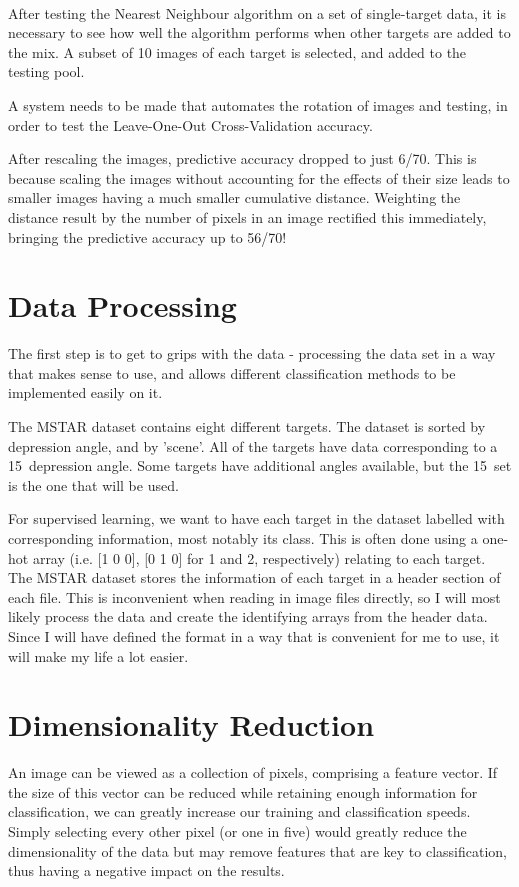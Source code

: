 \paragraph{}
After testing the Nearest Neighbour algorithm on a set of single-target data, it is necessary to see how well the algorithm performs when other targets are added to the mix. A subset of 10 images of each target is selected, and added to the testing pool.

A system needs to be made that automates the rotation of images and testing, in order to test the Leave-One-Out Cross-Validation accuracy.

After rescaling the images, predictive accuracy dropped to just 6/70. This is because scaling the images without accounting for the effects of their size leads to smaller images having a much smaller cumulative distance. Weighting the distance result by the number of pixels in an image rectified this immediately, bringing the predictive accuracy up to 56/70!



\section{Data Processing}
The first step is to get to grips with the data - processing the data set in a way that makes sense to use, and allows different classification methods to be implemented easily on it.

The MSTAR dataset contains eight different targets. The dataset is sorted by depression angle, and by 'scene'. All of the targets have data corresponding to a 15\degree~depression angle. Some targets have additional angles available, but the 15\degree~set is the one that will be used. 

For supervised learning, we want to have each target in the dataset labelled with corresponding information, most notably its class. This is often done using a one-hot array (i.e. [1 0 0], [0 1 0] for 1 and 2, respectively) relating to each target. The MSTAR dataset stores the information of each target in a header section of each file. This is inconvenient when reading in image files directly, so I will most likely process the data and create the identifying arrays from the header data. Since I will have defined the format in a way that is convenient for me to use, it will make my life a lot easier.

\section{Dimensionality Reduction}
An image can be viewed as a collection of pixels, comprising a feature vector. If the size of this vector can be reduced while retaining enough information for classification, we can greatly increase our training and classification speeds. Simply selecting every other pixel (or one in five) would greatly reduce the dimensionality of the data but may remove features that are key to classification, thus having a negative impact on the results.
